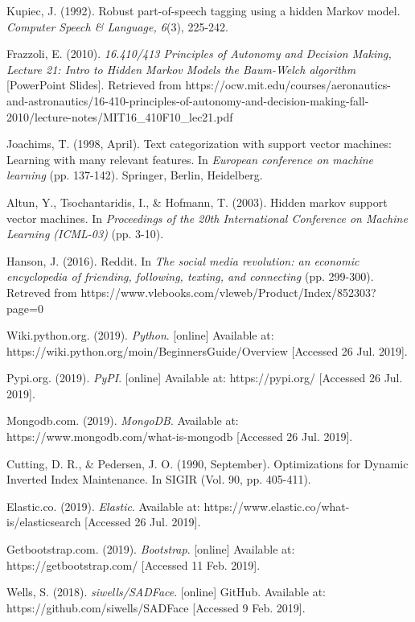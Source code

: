 \documentclass[12pt,a4paper]{article}
\begin{document}
\begin{thebibliography}{9}
  Kupiec, J. (1992). Robust part-of-speech tagging using a hidden Markov model. \textit{Computer Speech \& Language, 6}(3), 225-242.
  
  Frazzoli, E. (2010). \textit{16.410/413 Principles of Autonomy and Decision Making, Lecture 21:  Intro to Hidden Markov Models the Baum-Welch algorithm} [PowerPoint Slides]. Retrieved from https://ocw.mit.edu/courses/aeronautics-and-astronautics/16-410-principles-of-autonomy-and-decision-making-fall-2010/lecture-notes/MIT16\_410F10\_lec21.pdf

  Joachims, T. (1998, April). Text categorization with support vector machines: Learning with many relevant features. In \textit{European conference on machine learning} (pp. 137-142). Springer, Berlin, Heidelberg.
  
  Altun, Y., Tsochantaridis, I., \& Hofmann, T. (2003). Hidden markov support vector machines. In \textit{Proceedings of the 20th International Conference on Machine Learning (ICML-03)} (pp. 3-10).
  
  Hanson, J. (2016). Reddit. In \textit{The social media revolution: an economic encyclopedia of friending, following, texting, and connecting} (pp. 299-300). Retreved from https://www.vlebooks.com/vleweb/Product/Index/852303?page=0
  
  Wiki.python.org. (2019). \textit{Python}. [online] Available at: https://wiki.python.org/moin/BeginnersGuide/Overview [Accessed 26 Jul. 2019].
  
  Pypi.org. (2019). \textit{PyPI}. [online] Available at: https://pypi.org/ [Accessed 26 Jul. 2019].
  
  Mongodb.com. (2019). \textit{MongoDB}. Available at: https://www.mongodb.com/what-is-mongodb [Accessed 26 Jul. 2019].
  
  Cutting, D. R., \& Pedersen, J. O. (1990, September). Optimizations for Dynamic Inverted Index Maintenance. In SIGIR (Vol. 90, pp. 405-411).
  
  Elastic.co. (2019). \textit{Elastic}. Available at: https://www.elastic.co/what-is/elasticsearch [Accessed 26 Jul. 2019].
 
  Getbootstrap.com. (2019). \textit{Bootstrap}. [online] Available at: https://getbootstrap.com/ [Accessed 11 Feb. 2019].

  Wells, S. (2018). \textit{siwells/SADFace}. [online] GitHub. Available at: https://github.com/siwells/SADFace [Accessed 9 Feb. 2019].
 

\end{thebibliography}
\end{document}

